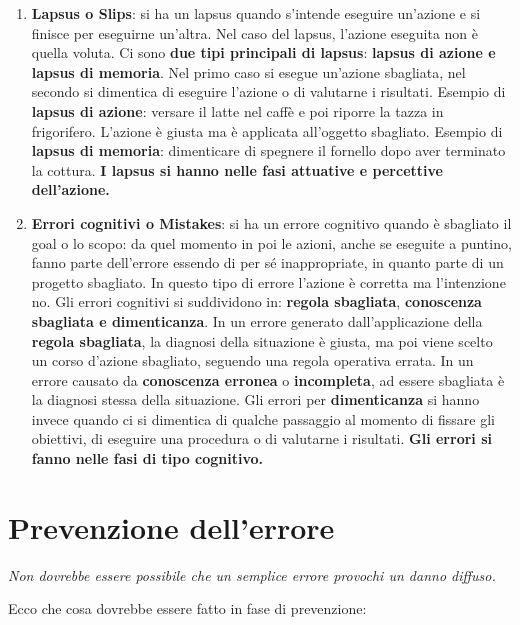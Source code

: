 \documentclass[a4paper,11pt,oneside]{book}
\begin{document}
\begin{enumerate}
	\item \textbf{Lapsus o Slips}: si ha un lapsus quando s'intende eseguire un'azione e si finisce per eseguirne un'altra. Nel caso del lapsus, l'azione eseguita non è quella voluta. Ci sono \textbf{due tipi principali di lapsus}:
	      \textbf{lapsus di azione e lapsus di memoria}.
	      Nel primo caso si esegue un'azione sbagliata, nel secondo si dimentica di eseguire
	      l'azione o di valutarne i risultati.
	      Esempio di \textbf{lapsus di azione}: versare il latte nel caffè e poi riporre la tazza in frigorifero. L'azione è giusta ma è applicata all'oggetto sbagliato.
	      Esempio di \textbf{lapsus di memoria}: dimenticare di spegnere il fornello dopo aver terminato la cottura. \textbf{I lapsus si hanno nelle fasi attuative e percettive dell'azione.}
	\item \textbf{Errori cognitivi o Mistakes}: si ha un errore cognitivo quando è sbagliato il goal o lo scopo: da quel momento in poi le azioni, anche se eseguite a puntino, fanno parte dell'errore essendo di per sé inappropriate, in quanto parte di un progetto sbagliato. In questo tipo di errore l'azione è corretta ma l'intenzione no.
	      Gli errori cognitivi si suddividono in: \textbf{regola sbagliata}, \textbf{conoscenza sbagliata e dimenticanza}. In un errore generato dall'applicazione della \textbf{regola sbagliata}, la
	      diagnosi della situazione è giusta, ma poi viene scelto un corso d'azione sbagliato,
	      seguendo una regola operativa errata. In un errore causato da \textbf{conoscenza erronea}
	      o \textbf{incompleta}, ad essere sbagliata è la diagnosi stessa della situazione. Gli errori per \textbf{dimenticanza} si hanno invece quando ci si dimentica di qualche passaggio al momento di fissare gli obiettivi, di eseguire una procedura o di valutarne i risultati. \textbf{Gli errori si fanno nelle fasi di tipo cognitivo.}
\end{enumerate}

\pagebreak

\section{Prevenzione dell'errore}

\begin{flushleft}
	\textit{Non dovrebbe essere possibile che un semplice errore provochi un danno diffuso.}
\end{flushleft}

Ecco che cosa dovrebbe essere fatto in fase di prevenzione:
\end{document}
